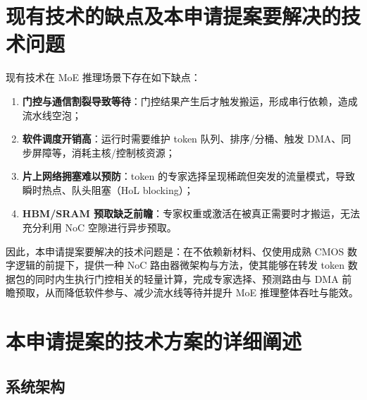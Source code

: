 \documentclass[12pt,a4paper]{article}
\begin{document}
\section{现有技术的缺点及本申请提案要解决的技术问题}

现有技术在 MoE 推理场景下存在如下缺点：
\begin{enumerate}
    \item \textbf{门控与通信割裂导致等待}：门控结果产生后才触发搬运，形成串行依赖，造成流水线空泡；
    \item \textbf{软件调度开销高}：运行时需要维护 token 队列、排序/分桶、触发 DMA、同步屏障等，消耗主核/控制核资源；
    \item \textbf{片上网络拥塞难以预防}：token 的专家选择呈现稀疏但突发的流量模式，导致瞬时热点、队头阻塞（HoL blocking）；
    \item \textbf{HBM/SRAM 预取缺乏前瞻}：专家权重或激活在被真正需要时才搬运，无法充分利用 NoC 空隙进行异步预取。
\end{enumerate}

因此，本申请提案要解决的技术问题是：在不依赖新材料、仅使用成熟 CMOS 数字逻辑的前提下，提供一种 NoC 路由器微架构与方法，使其能够在转发 token 数据包的同时内生执行门控相关的轻量计算，完成专家选择、预测路由与 DMA 前瞻预取，从而降低软件参与、减少流水线等待并提升 MoE 推理整体吞吐与能效。

\section{本申请提案的技术方案的详细阐述}

\subsection{系统架构}
\end{document}
